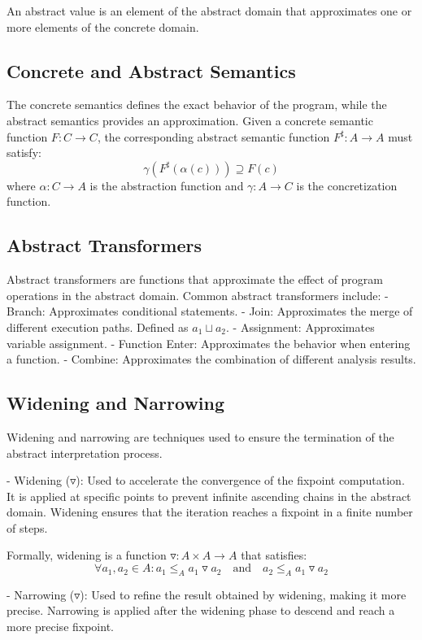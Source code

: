 An abstract value is an element of the abstract domain that approximates one or more elements of the concrete domain.

\subsection{Concrete and Abstract Semantics}

The concrete semantics defines the exact behavior of the program, while the abstract semantics provides an approximation. Given a concrete semantic function \(F: C \to C\), the corresponding abstract semantic function \(F^\sharp: A \to A\) must satisfy:
\[ \gamma(F^\sharp(\alpha(c))) \supseteq F(c) \]
where \(\alpha: C \to A\) is the abstraction function and \(\gamma: A \to C\) is the concretization function.

\subsection{Abstract Transformers}

Abstract transformers are functions that approximate the effect of program operations in the abstract domain. Common abstract transformers include:
- Branch: Approximates conditional statements.
- Join: Approximates the merge of different execution paths. Defined as \(a_1 \sqcup a_2\).
- Assignment: Approximates variable assignment.
- Function Enter: Approximates the behavior when entering a function.
- Combine: Approximates the combination of different analysis results.

\subsection{Widening and Narrowing}

Widening and narrowing are techniques used to ensure the termination of the abstract interpretation process.

- Widening (\(\triangledown\)): Used to accelerate the convergence of the fixpoint computation. It is applied at specific points to prevent infinite ascending chains in the abstract domain. Widening ensures that the iteration reaches a fixpoint in a finite number of steps.

  Formally, widening is a function \(\triangledown: A \times A \to A\) that satisfies:
  \[ \forall a_1, a_2 \in A: a_1 \leq_A a_1 \triangledown a_2 \quad \text{and} \quad a_2 \leq_A a_1 \triangledown a_2 \]

- Narrowing (\(\triangledown\)): Used to refine the result obtained by widening, making it more precise. Narrowing is applied after the widening phase to descend and reach a more precise fixpoint.

